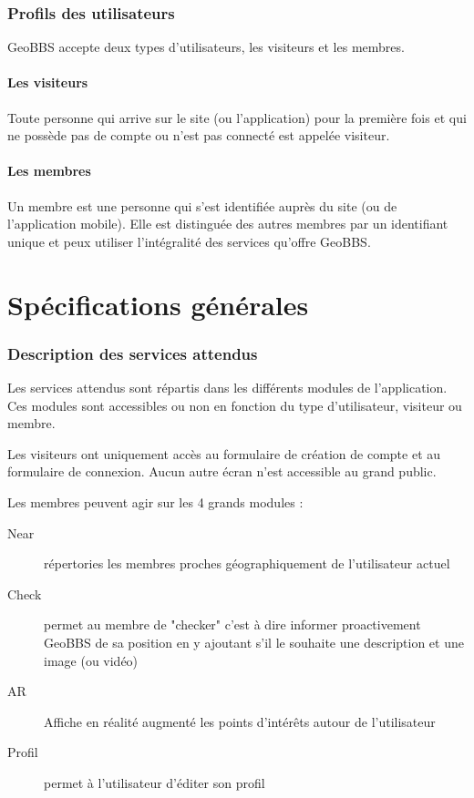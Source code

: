 \documentclass[a4paper,12pt]{report}
\begin{document}
\begin{onehalfspace}
\subsection{Profils des utilisateurs} %
\label{sub:profils_des_utilisateurs}

GeoBBS accepte deux types d’utilisateurs, les visiteurs et les membres.

\subsubsection{Les visiteurs}
Toute personne qui arrive sur le site (ou l'application) pour la première fois et qui ne possède pas de compte ou n’est pas connecté est appelée visiteur.

\subsubsection{Les membres}
Un membre est une personne qui s’est identifiée auprès du site (ou de l'application mobile). Elle est distinguée des autres membres par un identifiant unique et peux utiliser l’intégralité des services qu’offre GeoBBS.


\chapter{Spécifications générales} %
\label{cha:sp_cifications_g_n_rales}

\subsection{Description des services attendus}

Les services attendus sont répartis dans les différents modules de l’application. Ces modules sont accessibles ou non en fonction du type d’utilisateur, visiteur ou membre.

Les visiteurs ont uniquement accès au formulaire de création de compte et au formulaire de connexion. Aucun autre écran n’est accessible au grand public.

Les membres peuvent agir sur les 4 grands modules :
\begin{description}
  \item[Near] répertories les membres proches géographiquement de l'utilisateur actuel
  \item[Check] permet au membre de "checker" c'est à dire informer proactivement GeoBBS de sa position en y ajoutant s'il le souhaite une description et une image (ou vidéo)
  \item[AR] Affiche en réalité augmenté les points d'intérêts autour de l'utilisateur
  \item[Profil] permet à l'utilisateur d'éditer son profil
\end{description}


\end{onehalfspace}
\end{document}
